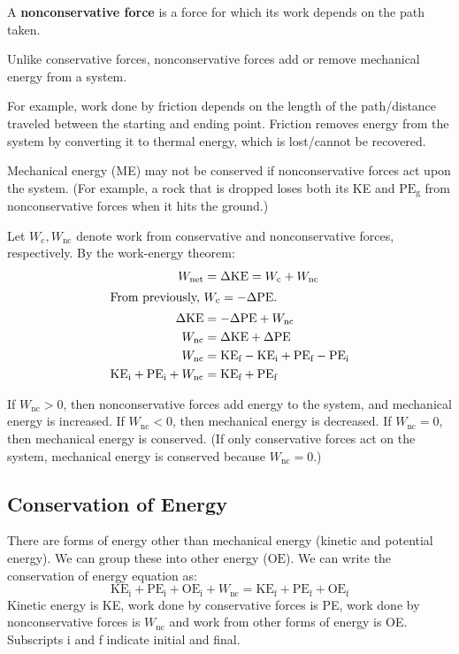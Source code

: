 \documentclass{article}
\newcommand{\definition}[1]{\begin{tcolorbox}[colback=red!5!white,colframe=red!75!black,parbox=false] #1 \end{tcolorbox}}
\begin{document}
\definition{A \textbf{nonconservative force} is a force for which its work depends on the path taken.}

Unlike conservative forces, nonconservative forces add or remove mechanical energy from a system.

For example, work done by friction depends on the length of the path/distance traveled between the starting and ending point. Friction removes energy from the system by converting it to thermal energy, which is lost/cannot be recovered.

Mechanical energy (ME) may not be conserved if nonconservative forces act upon the system. (For example, a rock that is dropped loses both its KE and $\text{PE}_\text{g}$ from nonconservative forces when it hits the ground.)

Let $W_{\text{c}},W_{\text{nc}}$ denote work from conservative and nonconservative forces, respectively. By the work-energy theorem:
\begin{align*}
	W_{\text{net}}
	&=\Delta \text{KE}
	=W_{\text{c}}+W_{\text{nc}} \\
	\intertext{From previously, $W_\text{c}=-\Delta \text{PE}$.}
	\Delta \text{KE}
	&=-\Delta \text{PE}+W_\text{nc} \\
	W_\text{nc}
	&=\Delta \text{KE}+\Delta \text{PE} \\
	W_\text{nc}
	&=\text{KE}_\text{f}-\text{KE}_\text{i}+\text{PE}_\text{f}-\text{PE}_\text{i} \\
	\text{KE}_\text{i}+\text{PE}_\text{i}+W_\text{nc}
	&=\text{KE}_\text{f}+\text{PE}_\text{f}
\end{align*}

If $W_\text{nc}>0$, then nonconservative forces add energy to the system, and mechanical energy is increased. If $W_\text{nc}<0$, then mechanical energy is decreased. If $W_\text{nc}=0$, then mechanical energy is conserved. (If only conservative forces act on the system, mechanical energy is conserved because $W_\text{nc}=0$.)

\subsection{Conservation of Energy}

There are forms of energy other than mechanical energy (kinetic and potential energy). We can group these into other energy ($\text{OE}$). We can write the conservation of energy equation as:
\begin{equation*}
	\text{KE}_\text{i}+\text{PE}_\text{i}+\text{OE}_\text{i}+W_\text{nc}=\text{KE}_\text{f}+\text{PE}_\text{f}+\text{OE}_\text{f}
\end{equation*}
Kinetic energy is KE, work done by conservative forces is PE, work done by nonconservative forces is $W_\text{nc}$ and work from other forms of energy is OE. Subscripts i and f indicate initial and final.
\end{document}
